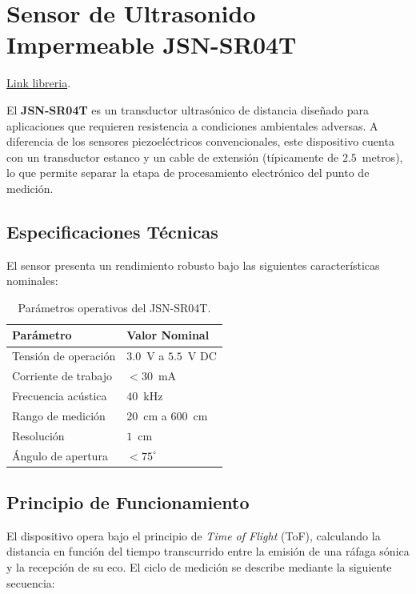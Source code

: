 \documentclass[12pt,a4paper]{article}
\begin{document}
\section{Sensor de Ultrasonido Impermeable JSN-SR04T}

\href{https://github.com/matutecno/PdM_workspace_Matias_Morales/blob/36632c7629ba2d8375b50d48365e32dbffeaf255/TPF/Personal_libs/JSNSR04T/Src/jsnsr04t.c}{Link libreria}.

El \textbf{JSN-SR04T} es un transductor ultrasónico de distancia diseñado para aplicaciones que requieren resistencia a condiciones ambientales adversas. A diferencia de los sensores piezoeléctricos convencionales, este dispositivo cuenta con un transductor estanco y un cable de extensión (típicamente de $2.5$~metros), lo que permite separar la etapa de procesamiento electrónico del punto de medición.

\subsection{Especificaciones Técnicas}

El sensor presenta un rendimiento robusto bajo las siguientes características nominales:

\begin{table}[htbp]
    \centering
    \caption{Parámetros operativos del JSN-SR04T.}
    \label{tab:specs_jsnsr04}
    \begin{tabular}{@{}ll@{}}
        \toprule
        \textbf{Parámetro} & \textbf{Valor Nominal} \\ \midrule
        Tensión de operación & $3.0$~V a $5.5$~V DC \\
        Corriente de trabajo & $< 30$~mA \\
        Frecuencia acústica  & $40$~kHz \\
        Rango de medición    & $20$~cm a $600$~cm \\
        Resolución           & $1$~cm \\
        Ángulo de apertura   & $< 75^{\circ}$ \\ \bottomrule
    \end{tabular}
\end{table}

\subsection{Principio de Funcionamiento}

El dispositivo opera bajo el principio de \textit{Time of Flight} (ToF), calculando la distancia en función del tiempo transcurrido entre la emisión de una ráfaga sónica y la recepción de su eco. El ciclo de medición se describe mediante la siguiente secuencia:
\end{document}
